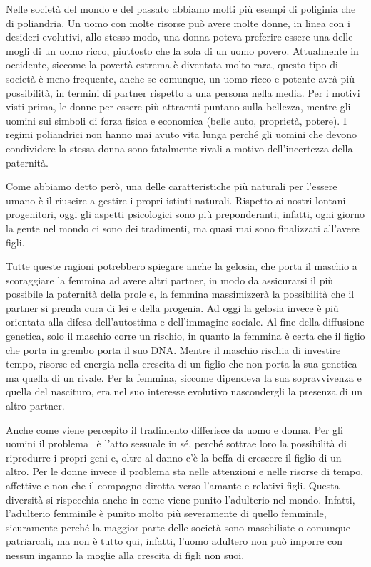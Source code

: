 \documentclass[12pt]{book} %
\begin{document}
Nelle società del mondo e del passato abbiamo molti più esempi di poliginia che di poliandria. Un uomo con molte risorse
può avere molte donne, in linea con i desideri evolutivi, allo stesso modo, una donna poteva preferire essere una delle
mogli di un uomo ricco, piuttosto che la sola di un uomo povero. Attualmente in occidente, siccome la povertà estrema è
diventata molto rara, questo tipo di società è meno frequente, anche se comunque, un uomo ricco e potente avrà più
possibilità, in termini di partner rispetto a una persona nella media. Per i motivi visti prima, le donne per essere
più attraenti puntano sulla bellezza, mentre gli uomini sui simboli di forza fisica e economica (belle auto, proprietà,
potere). I regimi poliandrici non hanno mai avuto vita lunga perché gli uomini che devono condividere la stessa donna
sono fatalmente rivali a motivo dell'incertezza della paternità.

Come abbiamo detto però, una delle caratteristiche più naturali per l'essere umano è il riuscire a
gestire i propri istinti naturali. Rispetto ai nostri lontani progenitori, oggi gli aspetti psicologici sono più
preponderanti, infatti, ogni giorno la gente nel mondo ci sono dei tradimenti, ma quasi mai sono finalizzati
all'avere figli. 

Tutte queste ragioni potrebbero spiegare anche la gelosia, che porta il maschio a scoraggiare la femmina ad avere altri
partner, in modo da assicurarsi il più possibile la paternità della prole e, la femmina massimizzerà la possibilità che
il partner si prenda cura di lei e della progenia. Ad oggi la gelosia invece è più orientata alla difesa
dell'autostima e dell'immagine sociale. Al fine della diffusione genetica,
solo il maschio corre un rischio, in quanto la femmina è certa che il figlio che porta in grembo porta il suo DNA.
Mentre il maschio rischia di investire tempo, risorse ed energia nella crescita di un figlio che non porta la sua
genetica ma quella di un rivale. Per la femmina, siccome dipendeva la sua sopravvivenza e quella del nascituro, era nel
suo interesse evolutivo nascondergli la presenza di un altro partner.

Anche come viene percepito il tradimento differisce da uomo e donna. Per gli uomini il problema \ è
l'atto sessuale in sé, perché sottrae loro la possibilità di riprodurre i propri geni e, oltre al
danno c'è la beffa di crescere il figlio di un altro. Per le donne invece il problema sta nelle
attenzioni e nelle risorse di tempo, affettive e non che il compagno dirotta verso l'amante e
relativi figli. Questa diversità si rispecchia anche in come viene punito l'adulterio nel mondo.
Infatti, l'adulterio femminile è punito molto più severamente di quello femminile, sicuramente
perché la maggior parte delle società sono maschiliste o comunque patriarcali, ma non è tutto qui, infatti,
l'uomo adultero non può imporre con nessun inganno la moglie alla crescita di figli non suoi.
\end{document}
